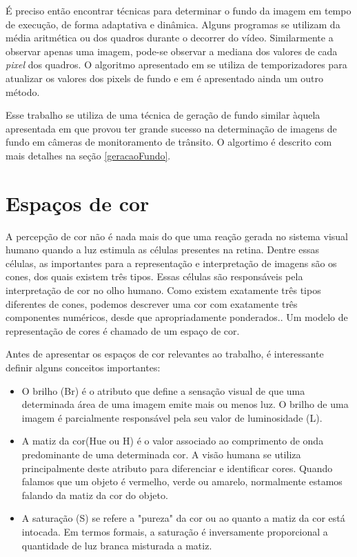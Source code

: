    É preciso então encontrar técnicas para determinar o fundo da imagem em tempo de execução, de forma adaptativa e dinâmica. Alguns programas se utilizam da média aritmética ou dos quadros durante o decorrer do vídeo. Similarmente a observar apenas uma imagem, pode-se observar a mediana dos valores de cada \textit{pixel} dos quadros. O algoritmo apresentado em \cite{shoushtarian2003practical} se utiliza de temporizadores para atualizar os valores dos pixels de fundo e em \cite{chen2012dynamic} é apresentado ainda um outro método.

   Esse trabalho se utiliza de uma técnica de geração de fundo similar àquela apresentada em \cite{hai2009self} que provou ter grande sucesso na determinação de imagens de fundo em câmeras de monitoramento de trânsito. O algortimo é descrito com mais detalhes na seção \ref{geracaoFundo}.



    \section{Espaços de cor} \label{espaçosCor}

    A percepção de cor não é nada mais do que uma reação gerada no sistema visual humano quando a luz estimula as células presentes na retina. Dentre essas células, as importantes para a representação e interpretação de imagens são os cones, dos quais existem três tipos. Essas células são responsáveis pela interpretação de cor no olho humano. Como existem exatamente três tipos diferentes de cones, podemos descrever uma cor com exatamente três componentes numéricos, desde que apropriadamente ponderados.\cite{plataniotis2000color}. Um modelo de representação de cores é chamado de um espaço de cor.

    Antes de apresentar os espaços de cor relevantes ao trabalho, é interessante definir alguns conceitos importantes:

    \begin{itemize}
       \item O brilho (Br) é o atributo que define a sensação visual de que uma determinada área de uma imagem emite mais ou menos luz.
       O brilho de uma imagem é parcialmente responsável pela seu valor de luminosidade (L).
       \item A matiz da cor(Hue ou H) é o valor associado ao comprimento de onda predominante de uma determinada cor. A visão humana se utiliza principalmente deste atributo para diferenciar e identificar cores. Quando falamos que um objeto é vermelho, verde ou amarelo, normalmente estamos falando da matiz da cor do objeto.
       \item A saturação (S) se refere a "pureza" da cor ou ao quanto a matiz da cor está intocada. Em termos formais, a saturação é inversamente proporcional a quantidade de luz branca misturada a matiz.
     \end{itemize}

